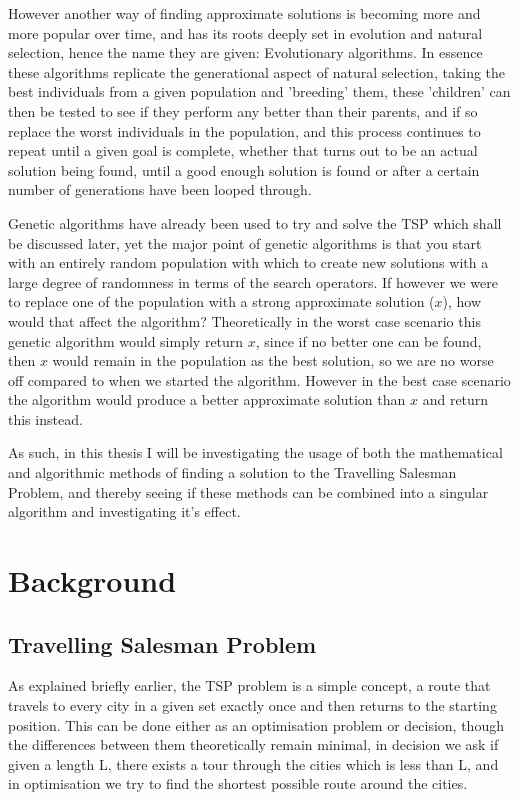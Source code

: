 \documentclass[11pt,a4paper,titlepage]{article}
\begin{document}
However another way of finding approximate solutions is becoming more and more popular over time, and has its roots deeply set in evolution and natural selection, hence the name they are given: Evolutionary algorithms. In essence these algorithms replicate the generational aspect of natural selection, taking the best individuals from a given population and 'breeding' them, these 'children' can then be tested to see if they perform any better than their parents, and if so replace the worst individuals in the population, and this process continues to repeat until a given goal is complete, whether that turns out to be an actual solution being found, until a good enough solution is found or after a certain number of generations have been looped through.

Genetic algorithms have already been used to try and solve the TSP which shall be discussed later, yet the major point of genetic algorithms is that you start with an entirely random population with which to create new solutions with a large degree of randomness in terms of the search operators. If however we were to replace one of the population with a strong approximate solution ($x$), how would that affect the algorithm? Theoretically in the worst case scenario this genetic algorithm would simply return $x$, since if no better one can be found, then $x$ would remain in the population as the best solution, so we are no worse off compared to when we started the algorithm. However in the best case scenario the algorithm would produce a better approximate solution than $x$ and return this instead.

As such, in this thesis I will be investigating the usage of both the mathematical and algorithmic methods of finding a solution to the Travelling Salesman Problem, and thereby seeing if these methods can be combined into a singular algorithm and investigating it's effect.


\section{Background}

\subsection{Travelling Salesman Problem}
As explained briefly earlier, the TSP problem is a simple concept, a route that travels to every city in a given set exactly once and then returns to the starting position. This can be done either as an optimisation problem or decision, though the differences between them theoretically remain minimal, in decision we ask if given a length L, there exists a tour through the cities which is less than L, and in optimisation we try to find the shortest possible route around the cities.
\end{document}
